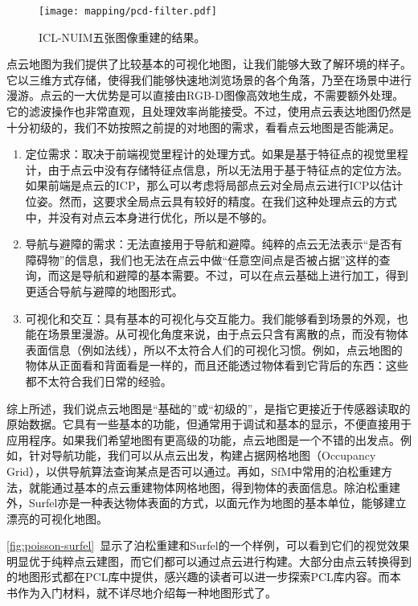 \begin{figure}[!ht]
	\centering
	\texttt{[image: mapping/pcd-filter.pdf]}
	\caption{ICL-NUIM五张图像重建的结果。}
	\label{fig:pcd-filter}
\end{figure}

点云地图为我们提供了比较基本的可视化地图，让我们能够大致了解环境的样子。它以三维方式存储，使得我们能够快速地浏览场景的各个角落，乃至在场景中进行漫游。点云的一大优势是可以直接由RGB-D图像高效地生成，不需要额外处理。它的滤波操作也非常直观，且处理效率尚能接受。不过，使用点云表达地图仍然是十分初级的，我们不妨按照之前提的对地图的需求，看看点云地图是否能满足。
\enlargethispage{-3pt}
\begin{enumerate}
	\item 定位需求：取决于前端视觉里程计的处理方式。如果是基于特征点的视觉里程计，由于点云中没有存储特征点信息，所以无法用于基于特征点的定位方法。如果前端是点云的ICP，那么可以考虑将局部点云对全局点云进行ICP以估计位姿。然而，这要求全局点云具有较好的精度。在我们这种处理点云的方式中，并没有对点云本身进行优化，所以是不够的。
	\item 导航与避障的需求：无法直接用于导航和避障。纯粹的点云无法表示“是否有障碍物”的信息，我们也无法在点云中做“任意空间点是否被占据”这样的查询，而这是导航和避障的基本需要。不过，可以在点云基础上进行加工，得到更适合导航与避障的地图形式。
	\item 可视化和交互：具有基本的可视化与交互能力。我们能够看到场景的外观，也能在场景里漫游。从可视化角度来说，由于点云只含有离散的点，而没有物体表面信息（例如法线），所以不太符合人们的可视化习惯。例如，点云地图的物体从正面看和背面看是一样的，而且还能透过物体看到它背后的东西：这些都不太符合我们日常的经验。
\end{enumerate}

综上所述，我们说点云地图是“基础的”或“初级的”，是指它更接近于传感器读取的原始数据。它具有一些基本的功能，但通常用于调试和基本的显示，不便直接用于应用程序。如果我们希望地图有更高级的功能，点云地图是一个不错的出发点。例如，针对导航功能，我们可以从点云出发，构建占据网格地图（Occupancy Grid），以供导航算法查询某点是否可以通过。再如，SfM中常用的泊松重建\textsuperscript{\cite{Kazhdan2006}}方法，就能通过基本的点云重建物体网格地图，得到物体的表面信息。除泊松重建外，Surfel亦是一种表达物体表面的方式，以面元作为地图的基本单位，能够建立漂亮的可视化地图\textsuperscript{\cite{Stuckler2014}}。

\autoref{fig:poisson-surfel}~显示了泊松重建和Surfel的一个样例，可以看到它们的视觉效果明显优于纯粹点云建图，而它们都可以通过点云进行构建。大部分由点云转换得到的地图形式都在PCL库中提供，感兴趣的读者可以进一步探索PCL库内容。而本书作为入门材料，就不详尽地介绍每一种地图形式了。


